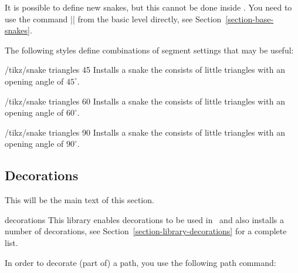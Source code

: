 It is possible to define new snakes, but this cannot be done inside
\tikzname. You need to use the command |\pgfdeclaresnake| from the
basic level directly, see Section~\ref{section-base-snakes}.

The following styles define combinations of segment settings that may
be useful:
\begin{stylekey}{/tikz/snake triangles 45}
  Installs a snake the consists of little triangles with an opening
  angle of $45^\circ$.
\end{stylekey}

\begin{stylekey}{/tikz/snake triangles 60}
  Installs a snake the consists of little triangles with an opening
  angle of $60^\circ$.
\end{stylekey}

\begin{stylekey}{/tikz/snake triangles 90}
  Installs a snake the consists of little triangles with an opening
  angle of $90^\circ$.
\end{stylekey}




\subsection{Decorations}

This will be the main text of this section.


\begin{tikzlibrary}{decorations}
  This library enables decorations to be used in \tikzname\ and also
  installs a number of decorations, see
  Section~\ref{section-library-decorations} for a complete list.
\end{tikzlibrary}

In order to decorate (part of) a path, you use the following path
command:
